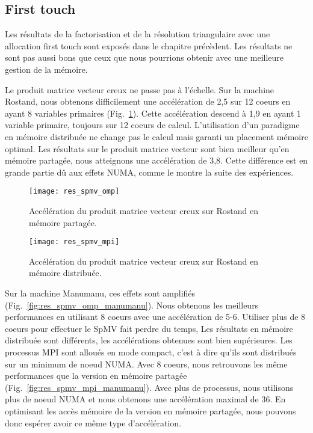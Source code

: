 \subsection{First touch}
Les résultats de la factorisation et de la résolution triangulaire avec une allocation first touch sont exposés dans le chapitre précèdent.
%
Les résultats ne sont pas aussi bons que ceux que nous pourrions obtenir avec une meilleure gestion de la mémoire.
%


Le produit matrice vecteur creux ne passe pas à l'échelle.
%
Sur la machine Rostand, nous obtenons difficilement une accélération de 2,5 sur 12 coeurs en ayant 8 variables primaires (Fig.~\ref{fig:res_spmv_omp_rostand}).
%
Cette accélération descend à 1,9 en ayant 1 variable primaire, toujours sur 12 coeurs de calcul.
%
L'utilisation d'un paradigme en mémoire distribuée ne change pas le calcul mais garanti un placement mémoire optimal.
%
Les résultats sur le produit matrice vecteur sont bien meilleur qu'en mémoire partagée, nous atteignons une accélération de 3,8.
%
Cette différence est en grande partie dû aux effets NUMA, comme le montre la suite des expériences.

\begin{figure}[t!]
  \centering
  \texttt{[image: res\_spmv\_omp]}
  \caption{Accélération du produit matrice vecteur creux sur Rostand en mémoire partagée.}
  \label{fig:res_spmv_omp_rostand}
\end{figure}

\begin{figure}[t!]
  \centering
  \texttt{[image: res\_spmv\_mpi]}
  \caption{Accélération du produit matrice vecteur creux sur Rostand en mémoire distribuée.}
  \label{fig:res_spmv_mpi_rostand}
\end{figure}




Sur la machine Manumanu, ces effets sont amplifiés (Fig.~\ref{fig:res_spmv_omp_manumanu}).
%
Nous obtenons les meilleurs performances en utilisant 8 coeurs avec une accélération de 5-6.
%
Utiliser plus de 8 coeurs pour effectuer le SpMV fait perdre du temps,
%
Les résultats en mémoire distribuée sont différents, les accélérations obtenues sont bien supérieures.
%
Les processus MPI sont alloués en mode compact, c'est à dire qu'ils sont distribués sur un minimum de noeud NUMA.
%
Avec 8 coeurs, nous retrouvons les même performances que la version en mémoire partagée (Fig.~\ref{fig:res_spmv_mpi_manumanu}).
%
Avec plus de processus, nous utilisons plus de noeud NUMA et nous obtenons une accélération maximal de 36.
%
En optimisant les accès mémoire de la version en mémoire partagée, nous pouvons donc espérer avoir ce même type d'accélération.


